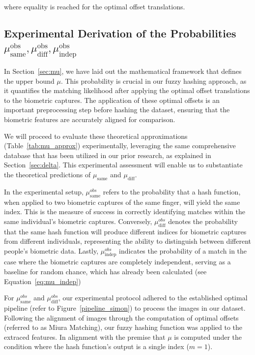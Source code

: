 where equality is reached for the optimal offset translations.

\subsection{Experimental Derivation of the Probabilities \(\mu_{\text{same}}^{\text{obs}}, \mu_{\text{diff}}^{\text{obs}}, \mu_{\text{indep}}^{\text{obs}}\)}

In Section~\ref{sec:mu}, we have laid out the mathematical framework that defines the upper bound \(\mu\). This probability is crucial in our fuzzy hashing approach, as it quantifies the matching likelihood after applying the optimal offset translations to the biometric captures. The application of these optimal offsets is an important preprocessing step before hashing the dataset, ensuring that the biometric features are accurately aligned for comparison.

We will proceed to evaluate these theoretical approximations (Table~\ref{tab:mu_approx}) experimentally, leveraging the same comprehensive database that has been utilized in our prior research, as explained in Section~\ref{sec:delta}. This experimental assessment will enable us to substantiate the theoretical predictions of \(\mu_{\text{same}}\) and \(\mu_{\text{diff}}\).

In the experimental setup, \(\mu^{obs}_{\text{same}}\) refers to the probability that a hash function, when applied to two biometric captures of the same finger, will yield the same index. This is the measure of success in correctly identifying matches within the same individual's biometric captures. Conversely, \(\mu^{obs}_{\text{diff}}\) denotes the probability that the same hash function will produce different indices for biometric captures from different individuals, representing the ability to distinguish between different people's biometric data. Lastly, \(\mu^{obs}_{\text{indep}}\) indicates the probability of a match in the case where the biometric captures are completely independent, serving as a baseline for random chance, which has already been calculated (see Equation~\ref{eq:mu_indep})

For \(\mu_{\text{same}}^{obs}\) and \(\mu_{\text{diff}}^{obs}\), our experimental protocol adhered to the established optimal pipeline (refer to Figure~\ref{pipeline_simon}) to process the images in our dataset. Following the alignment of images through the computation of optimal offsets (referred to as Miura Matching), our fuzzy hashing function was applied to the extraced features. In alignment with the premise that \(\mu\) is computed under the condition where the hash function's output is a single index (\(m=1\)).

